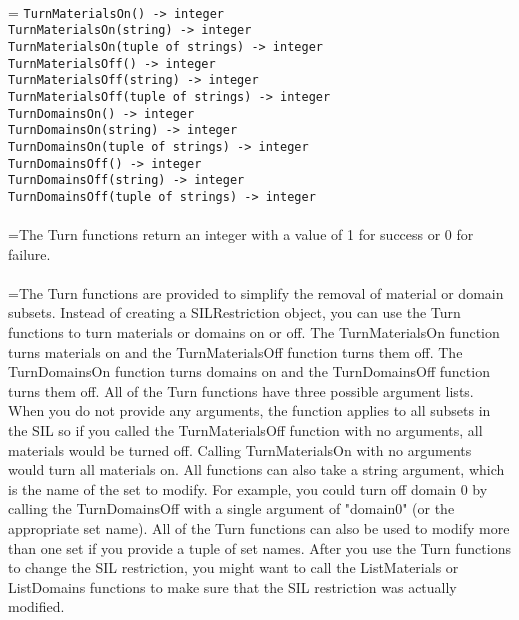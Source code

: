 \documentclass[10pt,a4paper]{report}
\begin{document}
 \\ 
\hangindent=\parindent 
\verb!TurnMaterialsOn() -> integer!\\ 
\verb!TurnMaterialsOn(string) -> integer!\\ 
\verb!TurnMaterialsOn(tuple of strings) -> integer!\\ 
\verb!TurnMaterialsOff() -> integer!\\ 
\verb!TurnMaterialsOff(string) -> integer!\\ 
\verb!TurnMaterialsOff(tuple of strings) -> integer!\\ 
\verb!TurnDomainsOn() -> integer!\\ 
\verb!TurnDomainsOn(string) -> integer!\\ 
\verb!TurnDomainsOn(tuple of strings) -> integer!\\ 
\verb!TurnDomainsOff() -> integer!\\ 
\verb!TurnDomainsOff(string) -> integer!\\ 
\verb!TurnDomainsOff(tuple of strings) -> integer!\\ [-3mm]

 \\ 
\hangindent=\parindent The Turn functions return an integer with a value of 1 for success or 0 for failure. \\[-3mm] 

 \\ 
\hangindent=\parindent The Turn functions are provided to simplify the removal of material or domain subsets. Instead of creating a SILRestriction object, you can use the Turn functions to turn materials or domains on or off. The TurnMaterialsOn function turns materials on and the TurnMaterialsOff function turns them off. The TurnDomainsOn function turns domains on and the TurnDomainsOff function turns them off. All of the Turn functions have three possible argument lists. When you do not provide any arguments, the function applies to all subsets in the SIL so if you called the TurnMaterialsOff function with no arguments, all materials would be turned off. Calling TurnMaterialsOn with no arguments would turn all materials on. All functions can also take a string argument, which is the name of the set to modify. For example, you could turn off domain 0 by calling the TurnDomainsOff with a single argument of "domain0" (or the appropriate set name). All of the Turn functions can also be used to modify more than one set if you provide a tuple of set names. After you use the Turn functions to change the SIL restriction, you might want to call the ListMaterials or ListDomains functions to make sure that the SIL restriction was actually modified. \\[-3mm] 
\end{document}
